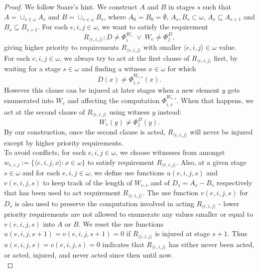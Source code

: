 \documentclass{article}
\begin{document}
  \begin{proof}
    We follow Soare's hint. We construct $A$ and $B$ in stages $s$ such
    that $A=\cup_{s\in\omega}A_s$ and $B=\cup_{s\in\omega}B_s$, where
    $A_0=B_0=\emptyset$, $A_s,B_s\subset\omega$, $A_s\subseteq A_{s+1}$ and
    $B_s\subseteq B_{s+1}$. For each $e,i,j\in\omega$, we want to satisfy
    the requirement
    \begin{equation}
      R_{\langle e,i,j\rangle}: D\neq \Phi_i^{W_e}\; \vee\;
      W_e\neq\Phi_j^D,
      \label{eq:requirement}
    \end{equation}
    giving higher priority to requirements $R_{\langle e,i,j\rangle}$ with
    smaller $\langle e,i,j\rangle\in\omega$ value. \\

    For each $e,i,j\in\omega$, we always try to act at the first clause
    of $R_{\langle e,i,j\rangle}$ first, by waiting for a stage
    $s\in\omega$ and finding a witness $x\in\omega$ for which
    \[D(x) \neq \Phi_{i,s}^{W_{e,s}}(x).\]
    However this clause can be injured at later stages when a new element
    $y$ gets enumerated into $W_e$ and affecting the computation
    $\Phi_{i,s}^{W_{e,s}}$. When that happens, we act at the second clause
    of $R_{\langle e,i,j\rangle}$ using witness $y$ instead: 
    \[W_e(y) \neq \Phi_j^D(y).\]
    By our construction, once the second clause is acted, $R_{\langle
    e,i,j\rangle}$ will never be injured except by higher priority
    requirements. \\

    To avoid conflicts, for each $e,i,j\in\omega$, we choose witnesses from
    amongst $w_{e,i,j}:=\{\langle e,i,j,x\rangle: x\in\omega\}$ to satisfy
    requirement $R_{\langle e,i,j\rangle}$. Also, at a given stage
    $s\in\omega$ and for each $e,i,j\in\omega$, we define use functions
    $u(e,i,j,s)$ and $v(e,i,j,s)$ to keep track of the length of $W_{e,s}$
    and of $D_s=A_s-B_s$ respectively that has been used to act
    requirement $R_{\langle e,i,j\rangle}$. The use function $v(e,i,j,s)$
    for $D_s$ is also used to preserve the computation involved in
    acting $R_{\langle e,i,j\rangle}$ - lower priority requirements are
    not allowed to enumerate any values smaller or equal to $v(e,i,j,s)$
    into $A$ or $B$. We reset the use functions
    $u(e,i,j,s+1)=v(e,i,j,s+1)=0$ if $R_{\langle e,i,j\rangle}$ is injured
    at stage $s+1$. Thus $u(e,i,j,s)=v(e,i,j,s)=0$ indicates that
    $R_{\langle e,i,j\rangle}$ has either never been acted, or
    acted, injured, and never acted since then until now. \\


\end{proof}
\end{document}
